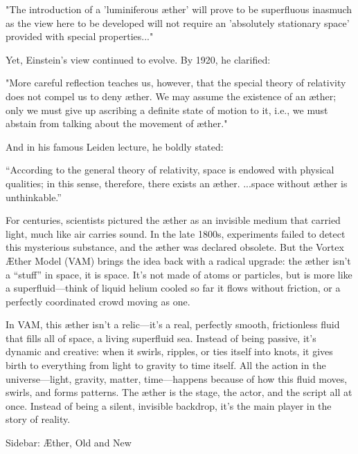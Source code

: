 \begin{itemize}
"The introduction of a 'luminiferous æther' will prove to be superfluous inasmuch as the view here to be developed will not require an 'absolutely stationary space' provided with special properties..."

Yet, Einstein’s view continued to evolve. By 1920, he clarified:

"More careful reflection teaches us, however, that the special theory of relativity does not compel us to deny æther. We may assume the existence of an æther; only we must give up ascribing a definite state of motion to it, i.e., we must abstain from talking about the movement of æther."

And in his famous Leiden lecture, he boldly stated:

“According to the general theory of relativity, space is endowed with physical qualities; in this sense, therefore, there exists an æther. ...space without æther is unthinkable.”





\end{itemize}

For centuries, scientists pictured the æther as an invisible medium that carried light, much like air carries sound. In the late 1800s, experiments failed to detect this mysterious substance, and the æther was declared obsolete. But the Vortex Æther Model (VAM) brings the idea back with a radical upgrade: the æther isn’t a “stuff” in space, it is space. It’s not made of atoms or particles, but is more like a superfluid—think of liquid helium cooled so far it flows without friction, or a perfectly coordinated crowd moving as one.


In VAM, this æther isn’t a relic—it’s a real, perfectly smooth, frictionless fluid that fills all of space, a living superfluid sea. Instead of being passive, it’s dynamic and creative: when it swirls, ripples, or ties itself into knots, it gives birth to everything from light to gravity to time itself. All the action in the universe—light, gravity, matter, time—happens because of how this fluid moves, swirls, and forms patterns. The æther is the stage, the actor, and the script all at once. Instead of being a silent, invisible backdrop, it’s the main player in the story of reality.


Sidebar: Æther, Old and New


